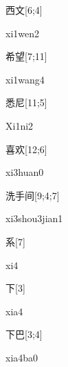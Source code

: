 \begin{verbete}[xi1wen2]{西文}[6;4]
\begin{pronuncia}{xi1wen2}
\end{pronuncia}
\end{verbete}

\begin{verbete}[xi1wang4]{希望}[7;11]
\begin{pronuncia}{xi1wang4}
\end{pronuncia}
\end{verbete}

\begin{verbete}[Xi1ni2]{悉尼}[11;5]
\begin{pronuncia}{Xi1ni2}
\end{pronuncia}
\end{verbete}

\begin{verbete}[xi3huan0]{喜欢}[12;6]
\begin{pronuncia}{xi3huan0}
\end{pronuncia}
\end{verbete}

\begin{verbete}{洗手间}[9;4;7]
\begin{pronuncia}{xi3shou3jian1}
\end{pronuncia}
\end{verbete}

\begin{verbete}[xi4]{系}[7]
\begin{pronuncia}{xi4}
\end{pronuncia}
\end{verbete}

\begin{verbete}[xia4]{下}[3]
\begin{pronuncia}{xia4}
\end{pronuncia}
\end{verbete}

\begin{verbete}[xia4ba0]{下巴}[3;4]
\begin{pronuncia}{xia4ba0}
\end{pronuncia}
\end{verbete}

